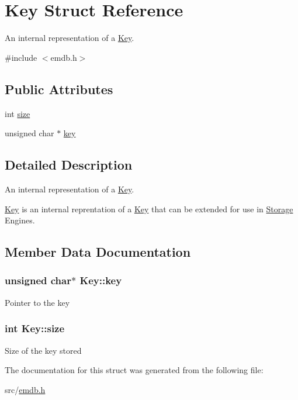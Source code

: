 \hypertarget{struct_key}{}\section{Key Struct Reference}
\label{struct_key}


An internal representation of a \hyperlink{struct_key}{Key}.  




{\ttfamily \#include $<$emdb.\+h$>$}

\subsection*{Public Attributes}
\begin{DoxyCompactItemize}
\item 
int \hyperlink{struct_key_a6822690c3762ec30af8b76a9e174002d}{size}
\item 
unsigned char $\ast$ \hyperlink{struct_key_a57e20ac98801f0079abee0c18a370d09}{key}
\end{DoxyCompactItemize}


\subsection{Detailed Description}
An internal representation of a \hyperlink{struct_key}{Key}. 

\hyperlink{struct_key}{Key} is an internal reprentation of a \hyperlink{struct_key}{Key} that can be extended for use in \hyperlink{struct_storage}{Storage} Engines. 

\subsection{Member Data Documentation}
\hypertarget{struct_key_a57e20ac98801f0079abee0c18a370d09}{}
\subsubsection[{key}]{\setlength{\rightskip}{0pt plus 5cm}unsigned char$\ast$ Key\+::key}\label{struct_key_a57e20ac98801f0079abee0c18a370d09}
Pointer to the key \hypertarget{struct_key_a6822690c3762ec30af8b76a9e174002d}{}
\subsubsection[{size}]{\setlength{\rightskip}{0pt plus 5cm}int Key\+::size}\label{struct_key_a6822690c3762ec30af8b76a9e174002d}
Size of the key stored 

The documentation for this struct was generated from the following file\+:\begin{DoxyCompactItemize}
\item 
src/\hyperlink{emdb_8h}{emdb.\+h}\end{DoxyCompactItemize}
